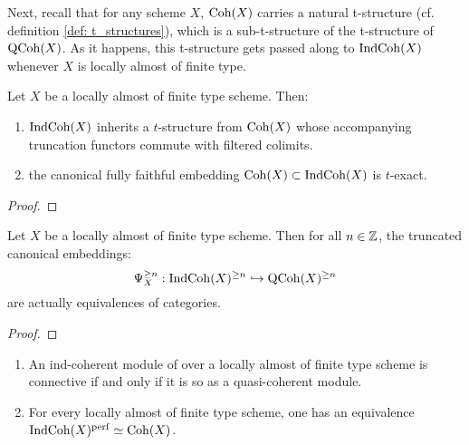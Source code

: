                     Next, recall that for any scheme $X$, $\mathrm{Coh}(X)$ carries a natural t-structure (cf. definition \ref{def: t_structures}), which is a sub-t-structure of the t-structure of $\mathrm{QCoh}(X)$. As it happens, this t-structure gets passed along to $\mathrm{Ind}\mathrm{Coh}(X)$ whenever $X$ is locally almost of finite type.
                    \begin{lemma} \label{lemma: t_structure_of_ind_coherent_sheaves}
                        Let $X$ be a locally almost of finite type scheme. Then:
                            \begin{enumerate}
                                \item $\mathrm{Ind}\mathrm{Coh}(X)$ inherits a $t$-structure from $\mathrm{Coh}(X)$ whose accompanying truncation functors commute with filtered colimits. 
                                \item the canonical fully faithful embedding $\mathrm{Coh}(X) \subset \mathrm{Ind}\mathrm{Coh}(X)$ is $t$-exact.
                            \end{enumerate}
                    \end{lemma}
                        \begin{proof}
                                        
                        \end{proof}
                    \begin{proposition} \label{prop: truncations_of_ind_coherent_sheaves}
                        Let $X$ be a locally almost of finite type scheme. Then for all $n \in \mathbb{Z}$, the truncated canonical embeddings:
                            $$\Psi_X^{\geq n}: \mathrm{Ind}\mathrm{Coh}(X)^{\geq n} \hookrightarrow \mathrm{QCoh}(X)^{\geq n}$$
                        are actually equivalences of categories.
                    \end{proposition}
                        \begin{proof}
                                        
                        \end{proof}
                    \begin{corollary} \label{coro: connectivity_of_ind_coherent_sheaves}
                        \noindent
                        \begin{enumerate}
                            \item An ind-coherent module of over a locally almost of finite type scheme is connective if and only if it is so as a quasi-coherent module.
                            \item For every locally almost of finite type scheme, one has an equivalence $\mathrm{Ind}\mathrm{Coh}(X)^{\mathrm{perf}} \simeq \mathrm{Coh}(X)$.
                        \end{enumerate}
                    \end{corollary}
                    

